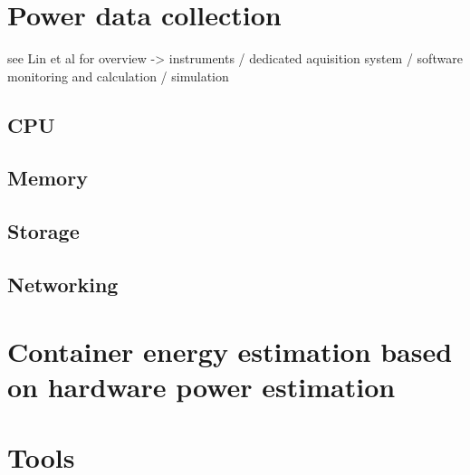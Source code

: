 \section{Power data collection}

see Lin et al for overview -> instruments / dedicated aquisition system / software monitoring and calculation / simulation

\subsection{CPU}

\subsection{Memory}

\subsection{Storage}

\subsection{Networking}

\section{Container energy estimation based on hardware power estimation}

\section{Tools}

